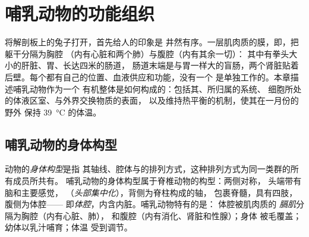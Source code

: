 \chapter{哺乳动物的功能组织}\label{ch:b1:mammal-organization}

将解剖板上的兔子打开，首先给人的印象是
井然有序。一层肌肉质的膜，即，把躯干分隔为胸腔
（内有心脏和两个肺）与腹腔（内有其余一切）：
其中有拳头大小的肝脏、胃、长达四米的肠道，
肠道末端是与胃一样大的盲肠，两个肾脏贴着
后壁。每个都有自己的位置、血液供应和功能，没有一个
是单独工作的。本章描述哺乳动物作为一个
有机整体是如何构成的：包括其、所归属的系统、
细胞所处的体液区室、与外界交换物质的表面，
以及维持热平衡的机制，使其在一月份的野外
保持 \qty{39}{\celsius} 的体温。

\section{哺乳动物的身体构型}

\begin{definition}[身体构型]\label{def:b1:mammal-organization:bodyplan}
动物的\emph{身体构型}是指
其轴线、腔体与的排列方式，这种排列方式为同一类群的所有成员所共有。
哺乳动物的身体构型属于脊椎动物的构型：两侧对称，
头端带有脑和主要感觉，
（\emph{头部集中化}），背侧为脊柱构成的轴，
包裹脊髓，具有四肢，腹侧为体腔——
即\emph{体腔}，内含内脏。哺乳动物特有的是：
体腔被肌肉质的
\emph{膈肌}分隔为胸腔（内有心脏、肺），
和腹腔（内有消化、肾脏和性腺）；身体
被毛覆盖；幼体以乳汁哺育；体温
受到调节。
\end{definition}

